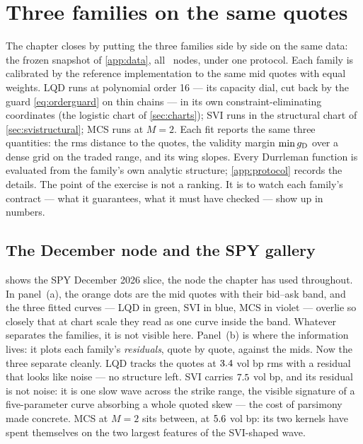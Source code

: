 \section{Three families on the same quotes}
\label{sec:comparison}

The chapter closes by putting the three families side by side on the
same data: the frozen snapshot of \cref{app:data}, all \MacCmpNodes\
nodes, under one protocol.  Each family is calibrated by the reference
implementation to the same mid quotes with equal weights.  LQD runs at
polynomial order 16 --- its capacity dial, cut back by the guard
\eqref{eq:orderguard} on thin chains --- in its own
constraint-eliminating coordinates (the logistic chart of
\cref{sec:charts}); SVI runs in the structural chart of
\cref{sec:svistructural}; MCS runs at $M=2$.  Each fit reports the
same three quantities: the rms
distance to the quotes, the validity margin $\min g_{\rm D}$ over a
dense grid on the traded range, and its wing slopes.  Every Durrleman
function is evaluated from the family's own analytic structure;
\cref{app:protocol} records the details.  The point of the exercise is
not a ranking.  It is to watch each family's contract --- what it
guarantees, what it must have checked --- show up in numbers.

\subsection{The December node and the SPY gallery}

 shows the SPY December 2026 slice, the node the
chapter has used throughout.  In panel~(a), the orange dots are the
mid quotes with their bid--ask band, and the three fitted curves ---
LQD in green, SVI in blue, MCS in violet --- overlie so closely that
at chart scale they read as one curve inside the band.  Whatever
separates the families, it is not visible here.  Panel~(b) is where
the information lives: it plots each family's \emph{residuals},
quote by quote, against the mids.  Now the three separate cleanly.
LQD tracks the quotes at $3.4$ vol bp rms with a residual
that looks like noise --- no structure left.  SVI carries
$7.5$ vol bp, and its residual is not noise: it is one
slow wave across the strike range, the visible signature of a
five-parameter curve absorbing a whole quoted skew --- the cost of
parsimony made concrete.  MCS at $M=2$ sits between, at
$5.6$ vol bp: its two kernels have spent themselves on
the two largest features of the SVI-shaped wave.

